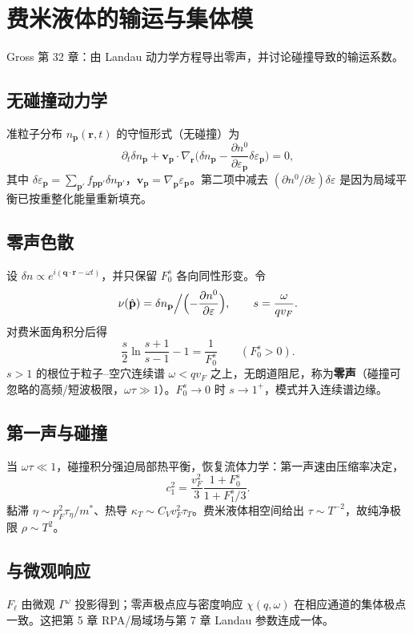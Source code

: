 \section{费米液体的输运与集体模}

Gross 第 32 章：由 Landau 动力学方程导出零声，并讨论碰撞导致的输运系数。

\subsection{无碰撞动力学}

准粒子分布 $n_{\mathbf{p}}(\mathbf{r},t)$ 的守恒形式（无碰撞）为
\begin{equation}
  \partial_t\delta n_{\mathbf{p}}
  +\mathbf{v}_{\mathbf{p}}\cdot\nabla_{\mathbf{r}}
  \bigl(
  \delta n_{\mathbf{p}}
  -\frac{\partial n^0}{\partial\varepsilon_{\mathbf{p}}}
  \delta\varepsilon_{\mathbf{p}}
  \bigr)
  =0,
\label{eq:landau_kinetic}
\end{equation}
其中 $\delta\varepsilon_{\mathbf{p}}=\sum_{\mathbf{p}'}f_{\mathbf{p}\mathbf{p}'}\delta n_{\mathbf{p}'}$，$\mathbf{v}_{\mathbf{p}}=\nabla_{\mathbf{p}}\varepsilon_{\mathbf{p}}$。第二项中减去 $(\partial n^0/\partial\varepsilon)\delta\varepsilon$ 是因为局域平衡已按重整化能量重新填充。

\subsection{零声色散}

设 $\delta n\propto e^{i(\mathbf{q}\cdot\mathbf{r}-\omega t)}$，并只保留 $F_0^s$ 各向同性形变。令
\begin{equation}
  \nu(\hat{\mathbf{p}})
  =\delta n_{\mathbf{p}}\Big/\Bigl(-\frac{\partial n^0}{\partial\varepsilon}\Bigr),
  \qquad
  s=\frac{\omega}{q v_F}.
\end{equation}
对费米面角积分后得
\begin{equation}
  \frac{s}{2}\ln\frac{s+1}{s-1}-1
  =\frac{1}{F_0^s}
  \qquad(F_0^s>0).
\label{eq:zerosound}
\end{equation}
$s>1$ 的根位于粒子--空穴连续谱 $\omega<q v_F$ 之上，无朗道阻尼，称为\textbf{零声}（碰撞可忽略的高频/短波极限，$\omega\tau\gg1$）。$F_0^s\to0$ 时 $s\to1^+$，模式并入连续谱边缘。

\subsection{第一声与碰撞}

当 $\omega\tau\ll1$，碰撞积分强迫局部热平衡，恢复流体力学：第一声速由压缩率决定，
\begin{equation}
  c_1^2
  =\frac{v_F^2}{3}
  \frac{1+F_0^s}{1+F_1^s/3}.
\end{equation}
黏滞 $\eta\sim p_F^2\tau_\eta/m^*$、热导 $\kappa_T\sim C_V v_F^2\tau_T$。费米液体相空间给出 $\tau\sim T^{-2}$，故纯净极限 $\rho\sim T^2$。

\subsection{与微观响应}

$F_\ell$ 由微观 $\Gamma^\omega$ 投影得到；零声极点应与密度响应 $\chi(q,\omega)$ 在相应通道的集体极点一致。这把第 5 章 RPA/局域场与第 7 章 Landau 参数连成一体。

